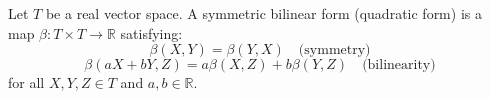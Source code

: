 Let $T$ be a real vector space. A symmetric bilinear form (quadratic form) is a map $\beta: T \times T \to \mathbb{R}$ satisfying:
$$\beta(X, Y) = \beta(Y, X) \quad \text{(symmetry)}$$
$$\beta(aX + bY, Z) = a\beta(X, Z) + b\beta(Y, Z) \quad \text{(bilinearity)}$$
for all $X, Y, Z \in T$ and $a, b \in \mathbb{R}$.